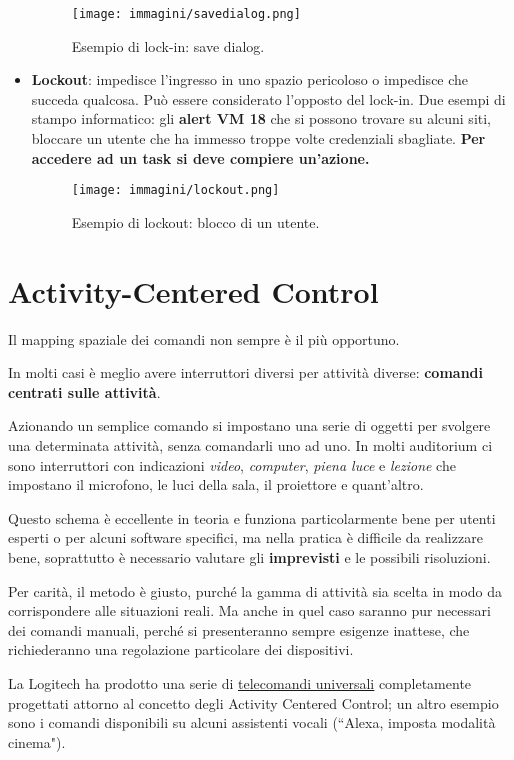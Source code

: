 \begin{itemize}
	\begin{figure}[!h]
		\centering
		\texttt{[image: immagini/savedialog.png]}
		\caption{Esempio di lock-in: save dialog.}
	\end{figure}


	\item \textbf{Lockout}: impedisce l'ingresso in uno spazio pericoloso o impedisce che succeda qualcosa. Può essere considerato l'opposto del lock-in.
	Due esempi di stampo informatico: gli \textbf{alert VM 18} che si possono trovare su alcuni siti, bloccare un utente che ha immesso troppe volte
	credenziali sbagliate. \textbf{Per accedere ad un task si deve compiere un'azione.}

	\begin{figure}[!h]
		\centering
		\texttt{[image: immagini/lockout.png]}
		\caption{Esempio di lockout: blocco di un utente.}
	\end{figure}

\end{itemize}

\section{Activity-Centered Control}
Il mapping spaziale dei comandi non sempre è il più opportuno.

In molti casi è meglio avere interruttori diversi per attività diverse: \textbf{comandi centrati sulle attività}.

Azionando un semplice comando si impostano una serie di oggetti per svolgere una determinata attività, senza comandarli uno ad uno. In molti auditorium
ci sono interruttori con indicazioni \textit{video}, \textit{computer}, \textit{piena luce} e \textit{lezione} che impostano il microfono, le luci della
sala, il proiettore e quant'altro.

Questo schema è eccellente in teoria e funziona particolarmente bene per utenti esperti o per alcuni software specifici, ma nella pratica è difficile
da realizzare bene, soprattutto è necessario valutare gli \textbf{imprevisti} e le possibili risoluzioni.

Per carità, il metodo è giusto, purché la gamma di attività sia scelta in modo da corrispondere alle situazioni reali. Ma anche in quel caso saranno
pur necessari dei comandi manuali, perché si presenteranno sempre esigenze inattese, che richiederanno una regolazione particolare dei dispositivi.

La Logitech ha prodotto una serie di \href{https://www.logitech.com/it-it/harmony-universal-remotes}{\underline{telecomandi universali}} completamente
progettati attorno al concetto degli Activity Centered Control; un altro esempio sono i comandi disponibili su alcuni assistenti vocali (``Alexa,
imposta modalità cinema").

